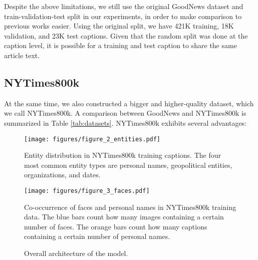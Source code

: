 \documentclass[10pt,twocolumn,letterpaper]{article}
\begin{document}
Despite the above limitations, we still use the original GoodNews dataset and
train-validation-test split in our experiments, in order to make comparison to
previous works easier. Using the original split, we have 421K training, 18K
validation, and 23K test captions. Given that the random split was done at the
caption level, it is possible for a training and test caption to share the same
article text.


\subsection{NYTimes800k}

At the same time, we also constructed a bigger and higher-quality dataset,
which we call NYTimes800k. A comparison between GoodNews and NYTimes800k is
summarized in Table \ref{tab:datasets}. NYTimes800k exhibits several
advantages:

\begin{figure}[t]
   \begin{center}
   \texttt{[image: figures/figure\_2\_entities.pdf]}
   \end{center}
      \caption{Entity distribution in NYTimes800k training captions. The four
               most common entity types are personal names, geopolitical
               entities, organizations, and dates.}
   \label{fig:entities}
\end{figure}

\begin{figure}[t]
   \begin{center}
   \texttt{[image: figures/figure\_3\_faces.pdf]}
   \end{center}
      \caption{Co-occurrence of faces and personal names in NYTimes800k
               training data. The blue bars count how many images containing a
               certain number of faces. The orange bars count how many captions
               containing a certain number of personal names.}
   \label{fig:faces}
\end{figure}

\begin{figure*}[t]
   \begin{center}
   \fbox{\rule{0pt}{2in} \rule{.9\linewidth}{0pt}}
   \end{center}
      \caption{Overall architecture of the model.}
   \label{fig:short}
\end{figure*}
\end{document}

